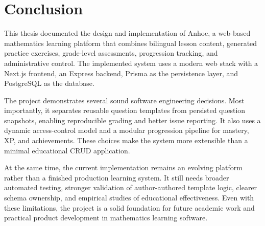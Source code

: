 \chapter{Conclusion}

This thesis documented the design and implementation of Anhoc, a web-based mathematics learning platform that combines bilingual lesson content, generated practice exercises, grade-level assessments, progression tracking, and administrative control. The implemented system uses a modern web stack with a Next.js frontend, an Express backend, Prisma as the persistence layer, and PostgreSQL as the database.

The project demonstrates several sound software engineering decisions. Most importantly, it separates reusable question templates from persisted question snapshots, enabling reproducible grading and better issue reporting. It also uses a dynamic access-control model and a modular progression pipeline for mastery, XP, and achievements. These choices make the system more extensible than a minimal educational CRUD application.

At the same time, the current implementation remains an evolving platform rather than a finished production learning system. It still needs broader automated testing, stronger validation of author-authored template logic, clearer schema ownership, and empirical studies of educational effectiveness. Even with these limitations, the project is a solid foundation for future academic work and practical product development in mathematics learning software.
